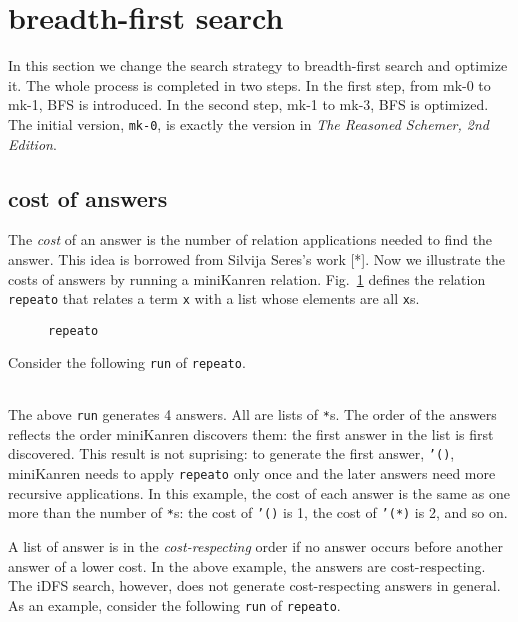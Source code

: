 \documentclass[format=acmlarge, review=true, authordraft=true]{acmart}
\begin{document}
\section{breadth-first search}

In this section we change the search strategy to breadth-first search and 
optimize it. The whole process is completed in two steps. In the first step, 
from mk-0 to mk-1, BFS is introduced. In the second step, mk-1 to mk-3, BFS is 
optimized. The initial version, \texttt{mk-0}, is exactly the version in 
\emph{The Reasoned Schemer, 2nd Edition}.

\subsection{cost of answers}


The \emph{cost} of an answer is the number of relation applications needed to
find the answer. This idea is borrowed from Silvija Seres's work [*].
Now we illustrate the costs of answers by running a miniKanren relation.
Fig.~\ref{def-repeato} defines the relation \texttt{repeato} that 
relates a term \texttt{x} with a list whose elements are all \texttt{x}s.

\begin{figure}
  
  \caption{\texttt{repeato}}
  \label{def-repeato}
\end{figure}

Consider the following \texttt{run} of \texttt{repeato}.
\begin{center}
  \begin{tabular}{c}
  
   \end{tabular}
\end{center}

The above \texttt{run} generates 4 answers. All are lists of \texttt{*}s.
The order of the answers reflects the order miniKanren discovers them:
the first answer in the list is first discovered. This result is not suprising:
to generate the first answer, \texttt{'()}, miniKanren needs to apply
\texttt{repeato} only once and the later answers need more recursive
applications. In this example, the cost of each answer is the same as
one more than the number of \texttt{*}s: the cost of \texttt{'()} is 1,
the cost of \texttt{'(*)} is 2, and so on.

A list of answer is in the \emph{cost-respecting} order if no answer occurs
before another answer of a lower cost. In the above example, the answers are
cost-respecting. The iDFS search, however, does not generate cost-respecting
answers in general. As an example, consider the following \texttt{run} of
\texttt{repeato}.
\begin{center}
  \begin{tabular}{c}
   
   \end{tabular}
\end{center}
\end{document}
